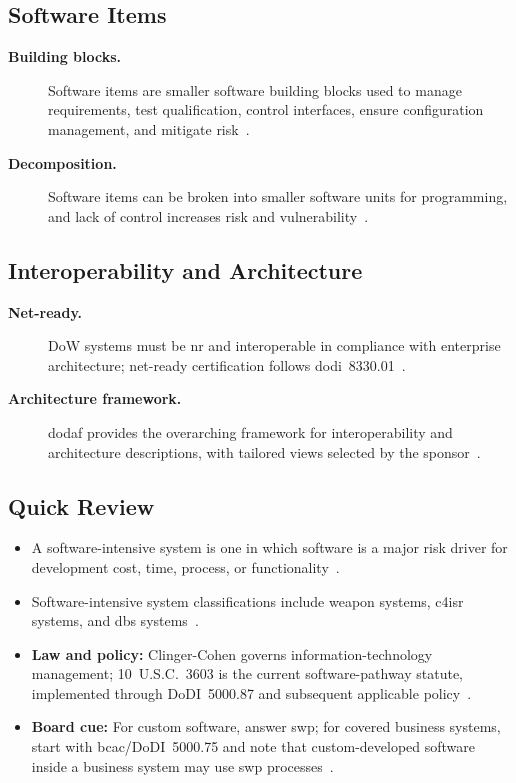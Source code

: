 \documentclass[../main.tex]{subfiles}
\begin{document}
\subsection{Software Items}
\begin{description}
  \item[\textbf{Building blocks.}] Software items are smaller software building blocks used to manage requirements, test qualification, control interfaces, ensure configuration management, and mitigate risk~\autocite{edo-3-4-1-software-acquisition-environment-2025}.
  \item[\textbf{Decomposition.}] Software items can be broken into smaller software units for programming, and lack of control increases risk and vulnerability~\autocite{edo-3-4-1-software-acquisition-environment-2025}.
\end{description}

\subsection{Interoperability and Architecture}
\begin{description}
  \item[\textbf{Net-ready.}] DoW systems must be \ac{nr} and interoperable in compliance with enterprise architecture; net-ready certification follows \ac{dodi}~8330.01~\autocite{edo-3-4-1-software-acquisition-environment-2025}.
  \item[\textbf{Architecture framework.}] \ac{dodaf} provides the overarching framework for interoperability and architecture descriptions, with tailored views selected by the sponsor~\autocite{edo-3-4-1-software-acquisition-environment-2025}.
\end{description}

\subsection{Quick Review}
\begin{itemize}
  \item A software-intensive system is one in which software is a major risk driver for development cost, time, process, or functionality~\autocite{edo-3-4-1-software-acquisition-environment-2025}.
  \item Software-intensive system classifications include weapon systems, \ac{c4isr} systems, and \ac{dbs} systems~\autocite{edo-3-4-1-software-acquisition-environment-2025}.
  \item \textbf{Law and policy:} Clinger-Cohen governs information-technology management; 10~U.S.C.\ 3603 is the current software-pathway statute, implemented through DoDI~5000.87 and subsequent applicable policy~\autocite{USC-10-3603,DoDI5000-87}.
  \item \textbf{Board cue:} For custom software, answer \ac{swp}; for covered business systems, start with \ac{bcac}/DoDI~5000.75 and note that custom-developed software inside a business system may use \ac{swp} processes~\autocite{DoDI5000-75,DoDI5000-87}.
\end{itemize}
\end{document}
